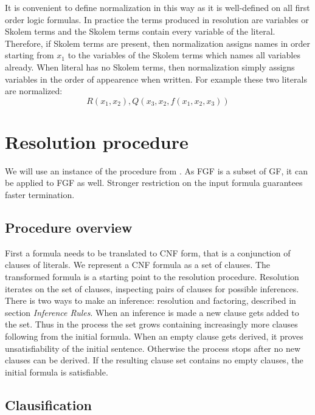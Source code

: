 \documentclass[english, shortabstract]{iithesis}
\theoremstyle{definition} \newtheorem{definition}{Definition}[chapter]
\theoremstyle{remark} \newtheorem{remark}[definition]{Observation}
\theoremstyle{plain} \newtheorem{theorem}[definition]{Theorem}
\theoremstyle{plain} \newtheorem{lemma}[definition]{Lemma}
\begin{document}
It is convenient to define normalization in this way as it is well-defined on all first order logic formulas.
In practice the terms produced in resolution are variables or Skolem terms and the Skolem terms contain every variable of the literal.
Therefore, if Skolem terms are present, then normalization assigns names in order 
starting from $x_1$ to the variables of the Skolem terms which names all variables already.
When literal has no Skolem terms, then normalization simply assigns variables in the order of appearence when written.
For example these two literals are normalized: $$R(x_1,x_2), Q(x_3, x_2, f(x_1,x_2, x_3))$$

\chapter{Resolution procedure}

We will use an instance of the procedure from \cite{resolution gf}. 
As FGF is a subset of GF, it can be applied to FGF as well.
Stronger restriction on the input formula guarantees faster termination.

\section{Procedure overview}

First a formula needs to be translated to CNF form, that is a conjunction of clauses of literals. 
We represent a CNF formula as a set of clauses. The transformed formula is a starting point to the resolution procedure.
Resolution iterates on the set of clauses, inspecting pairs of clauses for possible inferences.
There is two ways to make an inference: resolution and factoring, described in section \textit{Inference Rules}.
When an inference is made a new clause gets added to the set.
Thus in the process the set grows containing increasingly more clauses following from the initial formula.
When an empty clause gets derived, it proves unsatisfiability of the initial sentence.
Otherwise the process stops after no new clauses can be derived. If the resulting 
clause set contains no empty clauses, the initial formula is satisfiable.

\section{Clausification}
\end{document}
